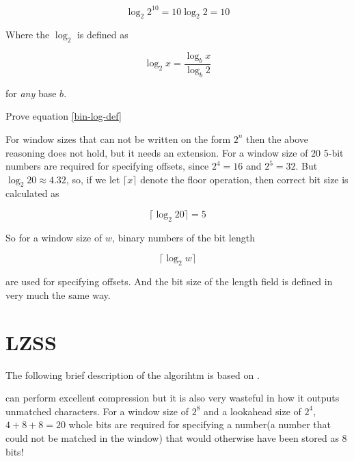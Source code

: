 \begin{equation*}
  \log_2 2^{10} = 10\log_2 2 = 10
\end{equation*}

Where the $\log_2$ is defined as\cite{schneider2008}

\begin{equation}
  \label{bin-log-def}
  \log_2x = \frac{\log_b x}{\log_b 2}
\end{equation}

for \textit{any} base $b$.

\begin{Exercise}[label={ex-bin-log}]
  Prove equation \eqref{bin-log-def}
\end{Exercise}

For window sizes that can not be written on the form $2^n$ then the
above reasoning does not hold, but it needs an extension. For a window
size of $20$ 5-bit numbers are required for specifying offsets, since
$2^4 = 16$ and $2^5 = 32$. But $\log_2 20 \approx 4.32$, so, if we let
$\lceil x \rceil$ denote the floor operation, then correct bit size is
calculated as

\begin{equation*}
  \lceil\log_2 20\rceil = 5
\end{equation*}

So for a window size of $w$, binary numbers of the bit length

\begin{equation*}
  \lceil\log_2 w\rceil
\end{equation*}

are used for specifying offsets. And the bit size of the length field
is defined in very much the same way.

\section{LZSS}

The following brief description of the \lzss algorihtm is based on
\cite{Salomon:2004:DCC,mark1996data_compression_book,mcfadden92:_hackin_data_compr_lzss,okumura:_data_compr_algor_larc_lharc}.

\lzone can perform excellent compression but it is also very wasteful
in how it outputs unmatched characters. For a window size of $2^8$ and
a lookahead size of $2^4$, $4 + 8 + 8 = 20$ whole bits are required
for specifying a number(a number that could not be matched in the
window) that would otherwise have been stored as 8 bits!

